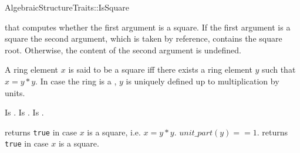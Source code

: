 

\begin{ccRefFunctionObjectConcept}{AlgebraicStructureTraits::IsSquare}

\ccDefinition

 that computes whether the first argument is a square. 
If the first argument is a square the second argument, which is taken by reference, contains the square root. 
Otherwise, the content of the second argument is undefined. 

A ring element $x$ is said to be a square iff there exists a ring element $y$ such
that $x= y*y$. In case the ring is a ,
$y$ is uniquely defined up to multiplication by units. \\


\ccRefines 


\ccTypes
{} 
        { Is .}
\ccGlue
{} 
        { Is .}
\ccGlue
{} 
        { Is .}

\ccOperations
{}

        { returns {\tt true} in case $x$ is a square, i.e. $x = y*y$.
          \ccPostcond $unit\_part(y) == 1$. 
        }
        { returns {\tt true} in case $x$ is a square.
        }


\ccSeeAlso


\end{ccRefFunctionObjectConcept} 
